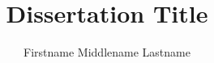 \documentclass[12pt]{xekudiss}
\title{Dissertation Title}
\author{Firstname Middlename Lastname}
\begin{document}
\begin{romanpages}

\maketitle




\tableofcontents

\listoffigures

\listoftables

\end{romanpages}






\end{document}
